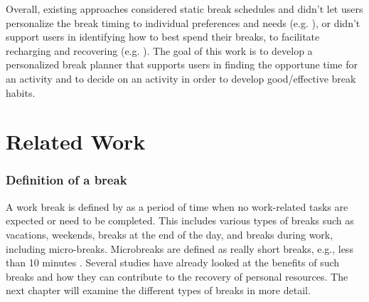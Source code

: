 \documentclass{hasel_thesis}
\begin{document}
Overall, existing approaches considered static break schedules and didn’t let users personalize the break timing to individual preferences and needs (e.g. \cite{Henning.1997} \cite{Cooley.2013}), or didn’t support users in identifying how to best spend their breaks, to facilitate recharging and recovering (e.g. \cite{Kaur.2020}). 
The goal of this work is to develop a personalized break planner that supports users in finding the opportune time for an activity and to decide on an activity in order to develop good/effective break habits. 

%

\chapter{Related Work}



\subsection{Definition of a break}

A work break is defined by \cite{Trougakos.2009} as a period of time when no work-related tasks are expected or need to be completed. This includes various types of breaks such as vacations, weekends, breaks at the end of the day, and breaks during work, including micro-breaks. Microbreaks are defined as really short breaks, e.g., less than 10 minutes \cite{BennettAndrewA.GabrielAllisonS.CalderwoodCharles.2020}. Several studies have already looked at the benefits of such breaks and how they can contribute to the recovery of personal resources.
The next chapter will examine the different types of breaks in more detail.
\end{document}
